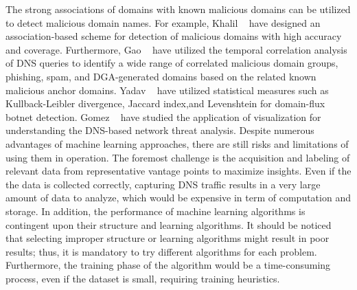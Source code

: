 The strong associations of domains with known malicious domains can be utilized to detect malicious domain names. For example, Khalil \etal~ have designed an association-based scheme for detection of malicious domains with high accuracy and coverage. Furthermore, Gao \etal~ have utilized the temporal correlation analysis of DNS queries to identify a wide range of correlated malicious domain groups, \eg phishing, spam, and DGA-generated domains based on the related known malicious anchor domains. Yadav \etal~ have utilized statistical measures such as Kullback-Leibler divergence, Jaccard index,and Levenshtein for domain-flux botnet detection. Gomez \etal~ have studied the application of visualization for understanding the DNS-based network threat analysis.
 Despite numerous advantages of machine learning approaches, there are still risks and limitations of using them in operation. The foremost challenge is the acquisition and labeling of relevant data from representative vantage points to maximize insights. Even if the the data is collected correctly, capturing DNS traffic results in a very large amount of data to analyze, which would be expensive in term of computation and storage. In addition, the performance of machine learning algorithms is contingent upon their structure and learning algorithms. It should be noticed that selecting improper structure or learning algorithms might result in poor results; thus, it is mandatory to try different algorithms for each problem. Furthermore, the training phase of the algorithm would be a time-consuming process, even if the dataset is small, requiring training heuristics.  
